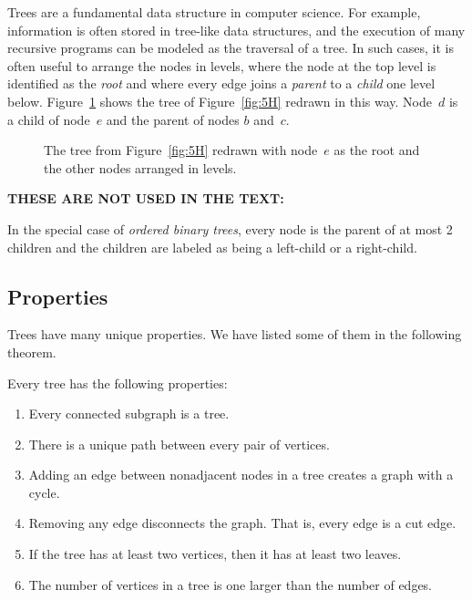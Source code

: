 Trees are a fundamental data structure in computer science.  For
example, information is often stored in tree-like data structures, and
the execution of many recursive programs can be modeled as the
traversal of a tree.  In such cases, it is often useful to arrange the
nodes in levels, where the node at the top level is identified as
the \emph{root} and where every edge joins a \emph{parent} to a
\emph{child} one level below.  Figure~\ref{fig:5JJ} shows the tree of
Figure~\ref{fig:5H} redrawn in this way.  Node~$d$ is a child of
node~$e$ and the parent of nodes $b$ and~$c$.

\begin{figure}


\caption{The tree from Figure~\ref{fig:5H} redrawn with node~$e$ as
  the root and the other nodes arranged in levels.}

\label{fig:5JJ}
\end{figure}

\begin{editingnotes}
\textbf{THESE ARE NOT USED IN THE TEXT:}

In the special case of \emph{ordered binary trees}, every node is the
parent of at most 2 children and the children are labeled as being a
left-child or a right-child.
\end{editingnotes}

\subsection{Properties}

Trees have many unique properties.  We have listed some of them in the
following theorem.

\begin{theorem}\label{th:treeprops}
Every tree has the following properties:

\begin{enumerate}

\item Every connected subgraph is a tree.\label{treeprops:asub}

\item There is a unique path between every pair of vertices.\label{treeprops:uniquepath}

\item Adding an edge between nonadjacent nodes in a tree creates a
  graph with a cycle.

\item Removing any edge disconnects the graph.  That is, every edge is
  a cut edge.

\item If the tree has at least two vertices, then it has at least two
  leaves.

\item\label{treeprops:v=e+1} The number of vertices in a tree is one larger than the number
  of edges.

\end{enumerate}
\end{theorem}


